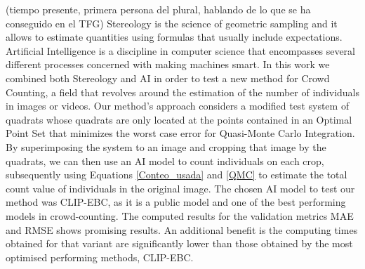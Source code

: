 (tiempo presente, primera persona del plural, hablando de lo que se ha conseguido en el TFG)
Stereology is the science of geometric sampling and it allows to estimate quantities using formulas that usually include expectations. Artificial Intelligence is a discipline in computer science that encompasses several different processes concerned with making machines smart. In this work we combined both Stereology and AI in order to test a new method for Crowd Counting, a field that revolves around the estimation of the number of individuals in images or videos. Our method's approach considers a modified test system of quadrats whose quadrats are only located at the points contained in an Optimal Point Set that minimizes the worst case error for Quasi-Monte Carlo Integration. By superimposing the system to an image and cropping that image by the quadrats, we can then use an AI model to count individuals on each crop, subsequently using Equations \ref{Conteo_usada} and \ref{QMC} to estimate the total count value of individuals in the original image. The chosen AI model to test our method was CLIP-EBC, as it is a public model and one of the best performing models in crowd-counting. The computed results for the validation metrics MAE and RMSE shows promising results.
An additional benefit is  the computing times obtained for that variant are significantly lower than those obtained by the most optimised performing methods, CLIP-EBC.\\

